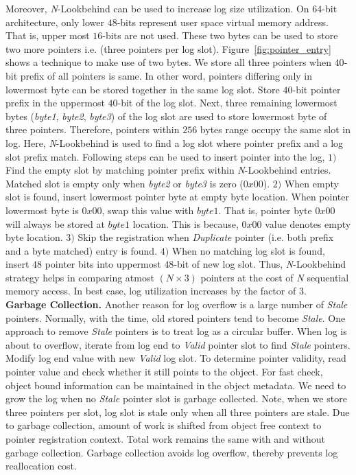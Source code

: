 Moreover, \emph{N}-Lookbehind can be used to increase log size utilization. On $64$-bit architecture, only lower $48$-bits represent user space virtual memory address. That is, upper most $16$-bits are not used. These two bytes can be used to store two more pointers i.e. (three pointers per log slot). Figure~\ref{fig:pointer_entry} shows a technique to make use of two bytes. We store all three pointers when $40$-bit prefix of all pointers is same. In other word, pointers differing only in lowermost byte can be stored together in the same log slot. Store $40$-bit pointer prefix in the uppermost $40$-bit of the log slot. Next, three remaining lowermost bytes (\textit{byte1}, \textit{byte2}, \textit{byte3}) of the log slot are used to store lowermost byte of three pointers.
Therefore, pointers within $256$ bytes range occupy the same slot in log. Here, \emph{N}-Lookbehind is used to find a log slot where pointer prefix and a log slot prefix match. Following steps can be used to insert pointer into the log, $1)$ Find the empty slot by matching pointer prefix within \emph{N}-Lookbehind entries. Matched slot is empty only when \textit{byte2} or \textit{byte3} is zero ($0x00$). $2)$ When empty slot is found, insert lowermost pointer byte at empty byte location. When pointer lowermost byte is $0x00$, swap this value with $byte1$. That is, pointer byte $0x00$ will always be stored at $byte1$ location. This is because, $0x00$ value denotes empty byte location. $3)$ Skip the registration when \textit{Duplicate} pointer (i.e. both prefix and a byte matched) entry is found. $4)$ When no matching log slot is found, insert $48$ pointer bits into uppermost $48$-bit of new log slot. Thus, \emph{N}-Lookbehind strategy helps in comparing atmost $(N \times 3)$ pointers at the cost of \emph{N} sequential memory access. In best case, log utilization increases by the factor of $3$. \\

\textbf{Garbage Collection.} 
Another reason for log overflow is a large number of \textit{Stale} pointers. Normally, with the time, old stored pointers tend to become \textit{Stale}. One approach to remove \textit{Stale} pointers is to treat log as a circular buffer. When log is about to overflow, iterate from log end to \textit{Valid} pointer slot to find \textit{Stale} pointers. Modify log end value with new \textit{Valid} log slot. To determine pointer validity, read pointer value and check whether it still points to the object. For fast check, object bound information can be maintained in the object metadata. We need to grow the log when no \textit{Stale} pointer slot is garbage collected. Note, when we store three pointers per slot, log slot is stale only when all three pointers are stale. Due to garbage collection, amount of work is shifted from object free context to pointer registration context. Total work remains the same with and without garbage collection. Garbage collection avoids log overflow, thereby prevents log reallocation cost. \\


